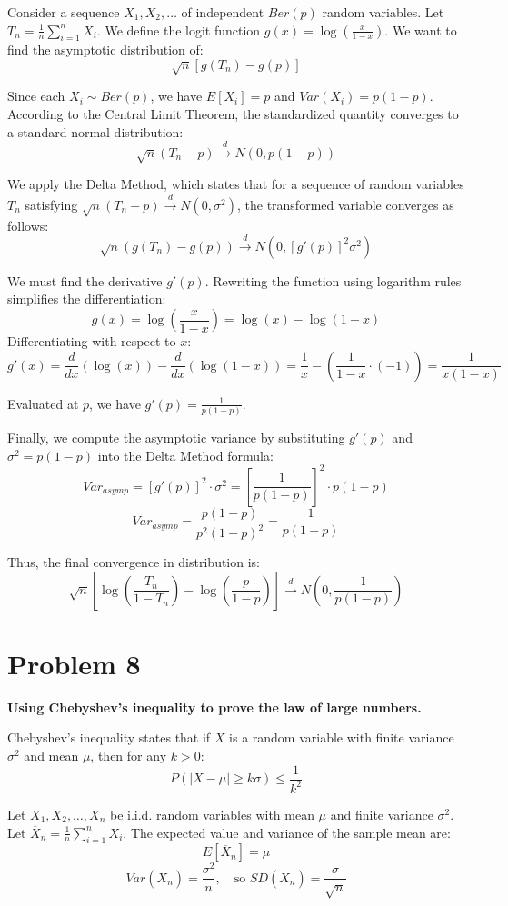 \documentclass[12pt]{article}
\begin{document}
Consider a sequence $X_1, X_2, \dots$ of independent $Ber(p)$ random variables. Let $T_n = \frac{1}{n}\sum_{i=1}^n X_i$. We define the logit function $g(x) = \log\left(\frac{x}{1-x}\right)$.
We want to find the asymptotic distribution of:
\[ \sqrt{n}\left[g(T_n) - g(p)\right] \]

Since each $X_i \sim Ber(p)$, we have $E[X_i] = p$ and $Var(X_i) = p(1-p)$. According to the Central Limit Theorem, the standardized quantity converges to a standard normal distribution:
\[ \sqrt{n}(T_n - p) \xrightarrow{d} N(0, p(1-p)) \]

We apply the Delta Method, which states that for a sequence of random variables $T_n$ satisfying $\sqrt{n}(T_n - p) \xrightarrow{d} N(0, \sigma^2)$, the transformed variable converges as follows:
\[ \sqrt{n}(g(T_n) - g(p)) \xrightarrow{d} N\left(0, [g'(p)]^2 \sigma^2\right) \]

We must find the derivative $g'(p)$. Rewriting the function using logarithm rules simplifies the differentiation:
\[ g(x) = \log\left(\frac{x}{1-x}\right) = \log(x) - \log(1-x) \]
Differentiating with respect to $x$:
\[ g'(x) = \frac{d}{dx}(\log(x)) - \frac{d}{dx}(\log(1-x)) = \frac{1}{x} - \left(\frac{1}{1-x} \cdot (-1)\right) = \frac{1}{x(1-x)}  \]

Evaluated at $p$, we have $g'(p) = \frac{1}{p(1-p)}$.

Finally, we compute the asymptotic variance by substituting $g'(p)$ and $\sigma^2 = p(1-p)$ into the Delta Method formula:
\[ Var_{asymp} = [g'(p)]^2 \cdot \sigma^2 = \left[ \frac{1}{p(1-p)} \right]^2 \cdot p(1-p) \]
\[ Var_{asymp} = \frac{p(1-p)}{p^2(1-p)^2} = \frac{1}{p(1-p)} \]

Thus, the final convergence in distribution is:
\[ \sqrt{n}\left[\log\left(\frac{T_n}{1-T_n}\right) - \log\left(\frac{p}{1-p}\right)\right] \xrightarrow{d} N\left(0, \frac{1}{p(1-p)}\right) \]

\newpage

\section*{Problem 8}
\textbf{Using Chebyshev's inequality to prove the law of large numbers.}

Chebyshev's inequality states that if $X$ is a random variable with finite variance $\sigma^2$ and mean $\mu$, then for any $k > 0$:
\[ P(|X - \mu| \ge k\sigma) \le \frac{1}{k^2} \]

Let $X_1, X_2, \dots, X_n$ be i.i.d. random variables with mean $\mu$ and finite variance $\sigma^2$.
Let $\overline{X}_n = \frac{1}{n}\sum_{i=1}^n X_i$.
The expected value and variance of the sample mean are:
\[ E[\overline{X}_n] = \mu \]
\[ Var(\overline{X}_n) = \frac{\sigma^2}{n}, \quad \text{so } SD(\overline{X}_n) = \frac{\sigma}{\sqrt{n}} \]
\end{document}
